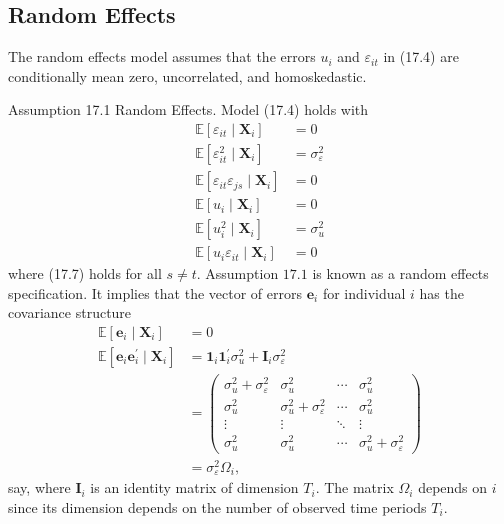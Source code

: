 \documentclass[10pt]{article}
\begin{document}
\subsection{Random Effects}
The random effects model assumes that the errors $u_{i}$ and $\varepsilon_{i t}$ in (17.4) are conditionally mean zero, uncorrelated, and homoskedastic.

Assumption 17.1 Random Effects. Model (17.4) holds with
$$
\begin{aligned}
\mathbb{E}\left[\varepsilon_{i t} \mid \boldsymbol{X}_{i}\right] &=0 \\
\mathbb{E}\left[\varepsilon_{i t}^{2} \mid \boldsymbol{X}_{i}\right] &=\sigma_{\varepsilon}^{2} \\
\mathbb{E}\left[\varepsilon_{i t} \varepsilon_{j s} \mid \boldsymbol{X}_{i}\right] &=0 \\
\mathbb{E}\left[u_{i} \mid \boldsymbol{X}_{i}\right] &=0 \\
\mathbb{E}\left[u_{i}^{2} \mid \boldsymbol{X}_{i}\right] &=\sigma_{u}^{2} \\
\mathbb{E}\left[u_{i} \varepsilon_{i t} \mid \boldsymbol{X}_{i}\right] &=0
\end{aligned}
$$
where (17.7) holds for all $s \neq t$. Assumption $17.1$ is known as a random effects specification. It implies that the vector of errors $\boldsymbol{e}_{i}$ for individual $i$ has the covariance structure
$$
\begin{aligned}
\mathbb{E}\left[\boldsymbol{e}_{i} \mid \boldsymbol{X}_{i}\right] &=0 \\
\mathbb{E}\left[\boldsymbol{e}_{i} \boldsymbol{e}_{i}^{\prime} \mid \boldsymbol{X}_{i}\right] &=\mathbf{1}_{i} \mathbf{1}_{i}^{\prime} \sigma_{u}^{2}+\boldsymbol{I}_{i} \sigma_{\varepsilon}^{2} \\
&=\left(\begin{array}{cccc}
\sigma_{u}^{2}+\sigma_{\varepsilon}^{2} & \sigma_{u}^{2} & \cdots & \sigma_{u}^{2} \\
\sigma_{u}^{2} & \sigma_{u}^{2}+\sigma_{\varepsilon}^{2} & \cdots & \sigma_{u}^{2} \\
\vdots & \vdots & \ddots & \vdots \\
\sigma_{u}^{2} & \sigma_{u}^{2} & \cdots & \sigma_{u}^{2}+\sigma_{\varepsilon}^{2}
\end{array}\right) \\
&=\sigma_{\varepsilon}^{2} \Omega_{i},
\end{aligned}
$$
say, where $\boldsymbol{I}_{i}$ is an identity matrix of dimension $T_{i}$. The matrix $\Omega_{i}$ depends on $i$ since its dimension depends on the number of observed time periods $T_{i}$.
\end{document}
